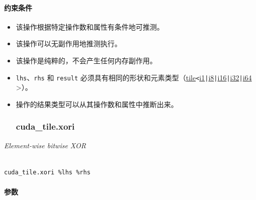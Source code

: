 \documentclass{article}
\begin{document}
\paragraph{约束条件}


\begin{itemize}
\item 该操作根据特定操作数和属性有条件地可推测。
\item 该操作可以无副作用地推测执行。
\item 该操作是纯粹的，不会产生任何内存副作用。
\item \texttt{lhs}、\texttt{rhs} 和 \texttt{result} 必须具有相同的形状和元素类型（\href{https://docs.nvidia.com/cuda/tile-ir/latest/sections/types.html#type-tile}{tile}\texttt{<}\href{https://docs.nvidia.com/cuda/tile-ir/latest/sections/types.html#subsection-element-types}{i1}\texttt{|}\href{https://docs.nvidia.com/cuda/tile-ir/latest/sections/types.html#subsection-element-types}{i8}\texttt{|}\href{https://docs.nvidia.com/cuda/tile-ir/latest/sections/types.html#subsection-element-types}{i16}\texttt{|}\href{https://docs.nvidia.com/cuda/tile-ir/latest/sections/types.html#subsection-element-types}{i32}\texttt{|}\href{https://docs.nvidia.com/cuda/tile-ir/latest/sections/types.html#subsection-element-types}{i64} >）。
\item 操作的结果类型可以从其操作数和属性中推断出来。




\subsubsection{cuda\_tile.xori}


\end{itemize}
\textit{Element-wise bitwise XOR}




\begin{lstlisting}

cuda_tile.xori %lhs %rhs

\end{lstlisting}



\paragraph{参数}
\end{document}
